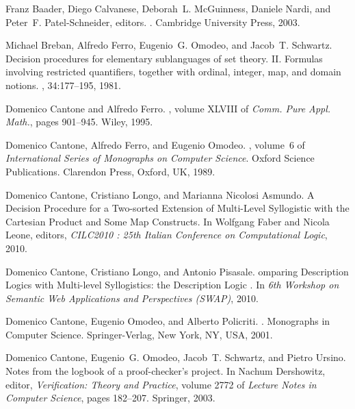 \documentclass[a4paper,UKenglish]{lipics}
\begin{document}
\begin{small}
\begin{thebibliography}{10}

Franz Baader, Diego Calvanese, Deborah~L. McGuinness, Daniele Nardi, and
  Peter~F. Patel-Schneider, editors.
.
\newblock Cambridge University Press, 2003.

Michael Breban, Alfredo Ferro, Eugenio~G. Omodeo, and Jacob~T. Schwartz.
\newblock Decision procedures for elementary sublanguages of set theory. {II}.
  {F}ormulas involving restricted quantifiers, together with ordinal, integer,
  map, and domain notions.
, 34:177--195,
  1981.

Domenico Cantone and Alfredo Ferro.
, volume XLVIII of {\em Comm. Pure Appl. Math.}, pages 901--945.
\newblock Wiley, 1995.

Domenico Cantone, Alfredo Ferro, and Eugenio Omodeo.
, volume~6 of {\em International Series of
  Monographs on Computer Science}.
\newblock Oxford Science Publications. Clarendon Press, Oxford, {UK}, 1989.

Domenico Cantone, Cristiano Longo, and Marianna {Nicolosi Asmundo}.
\newblock A {D}ecision {P}rocedure for a {T}wo-sorted {E}xtension of
  {M}ulti-{L}evel {S}yllogistic with the {C}artesian {P}roduct and {S}ome {M}ap
  {C}onstructs.
\newblock In Wolfgang Faber and Nicola Leone, editors, {\em CILC2010 : 25th
  Italian Conference on Computational Logic}, 2010.

Domenico Cantone, Cristiano Longo, and Antonio Pisasale.
omparing {D}escription {L}ogics with {M}ulti-level {S}yllogistics:
  the {D}escription {L}ogic \dlmlsscart.
\newblock In {\em 6th Workshop on Semantic Web Applications and Perspectives
  (SWAP)}, 2010.

Domenico Cantone, Eugenio Omodeo, and Alberto Policriti.
.
\newblock Monographs in Computer Science. Springer-Verlag, New York, NY, USA,
  2001.

Domenico Cantone, Eugenio~G. Omodeo, Jacob~T. Schwartz, and Pietro Ursino.
\newblock Notes from the logbook of a proof-checker's project.
\newblock In Nachum Dershowitz, editor, {\em Verification: Theory and
  Practice}, volume 2772 of {\em Lecture Notes in Computer Science}, pages
  182--207. Springer, 2003.


\end{thebibliography}
\end{small}
\end{document}
